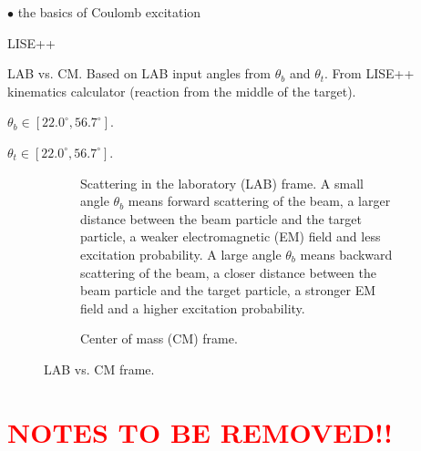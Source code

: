 \documentclass[twoside,english]{uiofysmaster/uiofysmaster}
\begin{document}
$\bullet$ the basics of Coulomb excitation 


\bigskip

LISE++ \cite{LISE}

\begin{table}[ht] 
    \centering 
    \caption{LAB vs. CM. Based on LAB input angles from $\theta_b$ and $\theta_t$. From LISE++ kinematics calculator (reaction from the middle of the target).}
	\label{tab:LABvsCM}
    \begin{subtable}{0.45\textwidth}
    		\centering
		\caption{$\theta_b \in [22.0^\circ, 56.7^\circ]$.}
	 	\label{tab:LABvsCM_b}
	 	
	\end{subtable}
	\begin{subtable}{0.45\textwidth}
		\centering
		\caption{$\theta_t \in [22.0^\circ, 56.7^\circ]$.}
		\label{tab:LABvsCM_t}
		
	\end{subtable}
\end{table}


\begin{figure}[ht]
	\centering
	\begin{subfigure}{\textwidth}
		
		\caption{Scattering in the laboratory (LAB) frame. A small angle $\theta_b$ means forward scattering of the beam, a larger distance between the beam particle and the target particle, a weaker electromagnetic (EM) field and less excitation probability. A large angle $\theta_b$ means backward scattering of the beam, a closer distance between the beam particle and the target particle, a stronger EM field and a higher excitation probability.}
		\label{fig:LAB}
	\end{subfigure}
	\begin{subfigure}{\textwidth}
		
		\caption{Center of mass (CM) frame.}
		\label{fig:CM}
	\end{subfigure}
	\caption{LAB vs. CM frame.}
	\label{fig:LAB-CM}
\end{figure}

\newpage

\chapter*{\textcolor{red}{NOTES TO BE REMOVED!!}}
\end{document}
